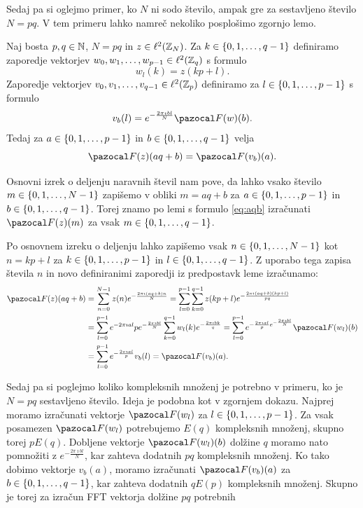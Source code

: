 %
Sedaj pa si oglejmo primer, ko $N$ ni sodo število, ampak gre za sestavljeno število $N = pq$. V tem primeru lahko namreč nekoliko posplošimo zgornjo lemo.
%
\begin{lema}
Naj bosta $p, q \in \mathbb N$, $N = pq$ in $z \in \ell^2(\mathbb Z_N)$. Za $k \in \left\{0, 1, \ldots, q-1\right\}$ definiramo zaporedje vektorjev $w_0, w_1, \ldots, w_{p-1} \in \ell^2(\mathbb Z_q)$ s formulo
$$w_l(k) = z(kp + l).$$
Zaporedje vektorjev $v_0, v_1, \ldots, v_{q-1} \in \ell^2(\mathbb Z_p)$ definiramo za $l \in \left\{0, 1, \ldots, p-1\right\}$ s formulo
$$v_b(l) = e^{-\frac{2\pi\imath bl}{N}} \F(w)(b).$$
Tedaj za $a \in \left\{0, 1, \ldots, p-1\right\}$ in $b \in \left\{0, 1, \ldots, q-1\right\}$ velja
\begin{equation}\label{eq:aqb}
\F(z)(aq + b) = \F(v_b)(a).
\end{equation}
\end{lema}
%
\begin{dokaz}
%
Osnovni izrek o deljenju naravnih števil nam pove, da lahko vsako število $m \in \left\{0, 1, \ldots, N-1\right\}$ zapišemo v obliki $m = aq + b$ za $a \in \left\{0, 1, \ldots, p-1\right\}$ in $b \in \left\{0, 1, \ldots, q-1\right\}$. Torej znamo po lemi s formulo \eqref{eq:aqb} izračunati $\F(z)(m)$ za vsak $m \in \left\{0, 1, \ldots, q-1\right\}$.

Po osnovnem izreku o deljenju lahko zapišemo vsak $n \in \left\{0, 1, \ldots, N-1\right\}$ kot $n = kp + l$ za $k \in \left\{0, 1, \ldots, p-1\right\}$ in $l \in \left\{0, 1, \ldots, q-1\right\}$. Z uporabo tega zapisa števila $n$ in novo definiranimi zaporedji iz predpostavk leme izračunamo:
\begin{align*}
  \F(z)(aq + b) & = \sum_{n=0}^{N-1} z(n) e^{-\frac{2\pi\imath(aq + b)n}{N}} = \sum_{l=0}^{p-1} \sum_{k=0}^{q-1} z(kp + l)e^{-\frac{2\pi\imath(aq + b)(kp + l)}{pq}} \\
  & = \sum_{l=0}^{p-1} e^{-2\pi\imath al}{p} e^{-\frac{2\pi\imath bl}{N}} \sum_{k=0}^{q-1} w_l(k) e^{-\frac{2\pi\imath bk}{q}} = \sum_{l=0}^{p-1} e^{-\frac{2\pi\imath al}{p} e^{-\frac{2\pi\imath bl}{N}}} \F(w_l)(b) \\
  & = \sum_{l=0}^{p-1} e^{-\frac{2\pi\imath al}{p}} v_b(l) = \F(v_b)(a).
\end{align*}
\end{dokaz}
%
Sedaj pa si poglejmo koliko kompleksnih množenj je potrebno v primeru, ko je $N = pq$ sestavljeno število. Ideja je podobna kot v zgornjem dokazu. Najprej moramo izračunati vektorje $\F(w_l)$ za $l \in \left\{0, 1, \ldots, p-1\right\}$. Za vsak posamezen $\F(w_l)$ potrebujemo $E(q)$ kompleksnih množenj, skupno torej $p E(q)$. Dobljene vektorje $\F(w_l)(b)$ dolžine $q$ moramo nato pomnožiti z $e^{-\frac{2\pi\imath bl}{N}}$, kar zahteva dodatnih $pq$ kompleksnih množenj. Ko tako dobimo vektorje $v_b(a)$, moramo izračunati $\F(v_b)(a)$ za $b \in \left\{0, 1, \ldots, q-1\right\}$, kar zahteva dodatnih $qE(p)$ kompleksnih množenj. Skupno je torej za izračun FFT vektorja dolžine $pq$ potrebnih
